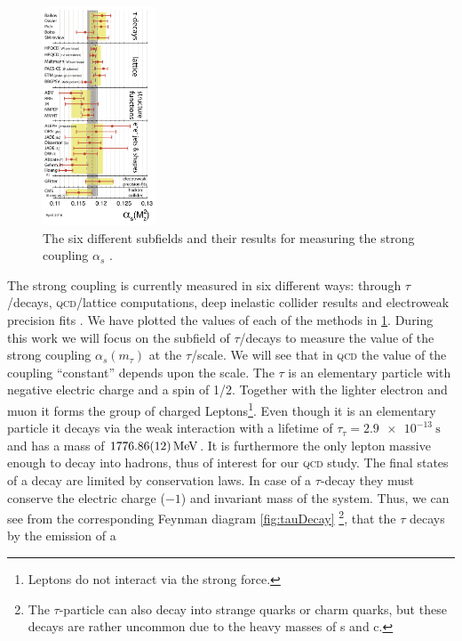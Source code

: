 \documentclass[../../index.tex]{subfiles}
\begin{document}
\begin{figure}
  \includegraphics[width=0.3\textwidth]{./images/alphasDetermination.png}
  \caption{The six different subfields and their results for measuring the
    strong coupling $\alpha_s$ \cite{PDG2018}.}
  \label{fig:alphaSDetermination}
\end{figure}
The strong coupling is currently measured in six different ways: through
$\tau$\-/decays, \textsc{qcd}\-/lattice computations, deep inelastic collider
results and electroweak precision fits \cite{PDG2018}. We have plotted the
values of each of the methods in \cref{fig:alphaSDetermination}. During this
work we will focus on the subfield of $\tau$\-/decays to measure the value of
the strong coupling $\alpha_s(m_\tau)$ at the $\tau$\-/scale. We will see that
in \textsc{qcd} the value of the coupling ``constant'' depends upon the scale.
The $\tau$ is an elementary particle with negative electric charge and a spin of
1/2. Together with the lighter electron and muon it forms the group of charged
Leptons\footnote{Leptons do not interact via the strong force.}. Even though it
is an elementary particle it decays via the weak interaction with a lifetime of
$\tau_\tau=\SI{2.9e-13}{\second}$ and has a mass of
$\SI{1776.86\pm0.12}{\mega\electronvolt}$\cite{PDG2018}. It is furthermore the
only lepton massive enough to decay into hadrons, thus of interest for our
\textsc{qcd} study. The final states of a decay are limited by conservation
laws. In case of a $\tau$-decay they must conserve the electric charge ($-1$)
and invariant mass of the system. Thus, we can see from the corresponding
Feynman diagram \cref{fig:tauDecay} \footnote{The $\tau$-particle can also decay
  into strange quarks or charm quarks, but these decays are rather uncommon due
  to the heavy masses of s and c.}, that the $\tau$ decays by the emission of a
\end{document}
